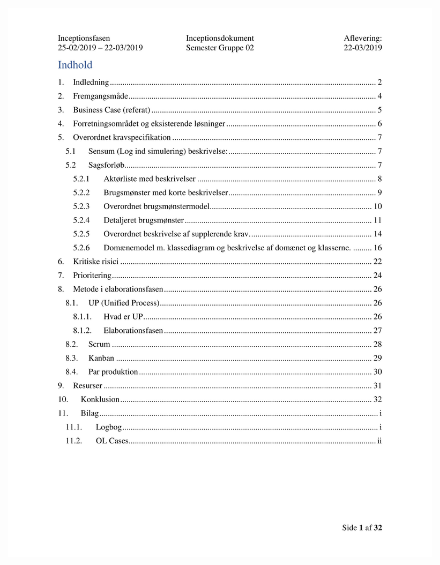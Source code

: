\begin{figure}[hb]
  \includegraphics[width=\linewidth]{./PNG/Inceptions/Gruppe 02 + InceptionsDokument-02.jpg} 
\end{figure}

